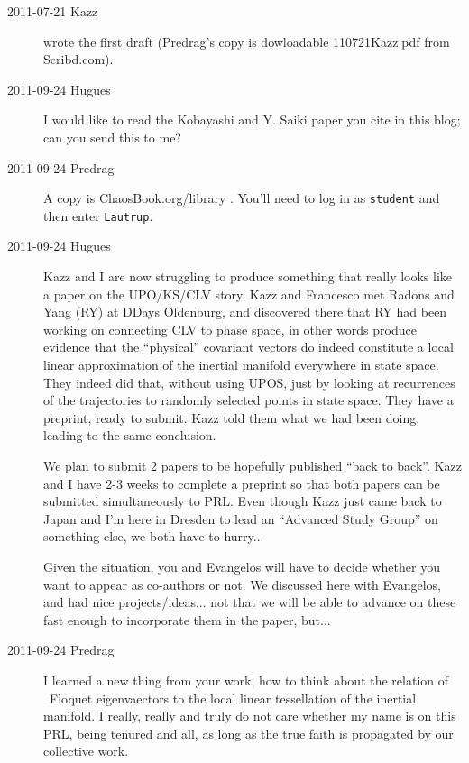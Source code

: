\begin{description}
\item[2011-07-21 Kazz] wrote the first draft (Predrag's
copy is dowloadable
{110721Kazz.pdf} from Scribd.com).

\item[2011-09-24 Hugues]
I would like to read the  Kobayashi and Y. Saiki paper you
cite in this blog; can you send this to me?

\item[2011-09-24 Predrag]
A copy is ChaosBook.org/library
.
You'll need to log in as \texttt{student} and then enter \texttt{Lautrup}.

\item[2011-09-24 Hugues]
Kazz and I are now struggling to produce something that really looks like
a paper on the UPO/KS/CLV story. Kazz and Francesco met Radons and Yang
(RY) at DDays Oldenburg, and discovered there that RY had been working on
connecting CLV to phase space, in other words produce evidence that the
``physical'' covariant vectors do indeed constitute a local linear
approximation of the inertial manifold everywhere in state space. They
indeed did that, without using UPOS, just by looking at recurrences of
the trajectories to randomly selected points in state space. They have a
preprint, ready to submit. Kazz told them what we had been doing, leading
to the same conclusion.

We plan to submit 2 papers to be hopefully published ``back to back''.
Kazz and I have 2-3 weeks to complete a preprint so that both papers can
be submitted simultaneously to PRL. Even though Kazz just came back to
Japan and I'm here in Dresden to lead an ``Advanced Study Group'' on
something else, we both have to hurry...

Given the situation, you  and Evangelos  will have to decide
whether you want to appear as co-authors or not. We discussed
here with Evangelos, and had nice projects/ideas... not that we will be
able to advance on these fast enough to incorporate them in the paper,
but...

\item[2011-09-24 Predrag]
I learned a new thing from your work, how to think about the relation of
\po\ Floquet eigenvaectors to the local linear tessellation of the
inertial manifold.
I really, really and truly do not care whether my name is on this PRL,
being tenured and all, as long as the true faith is propagated by our
collective work.


\end{description}
